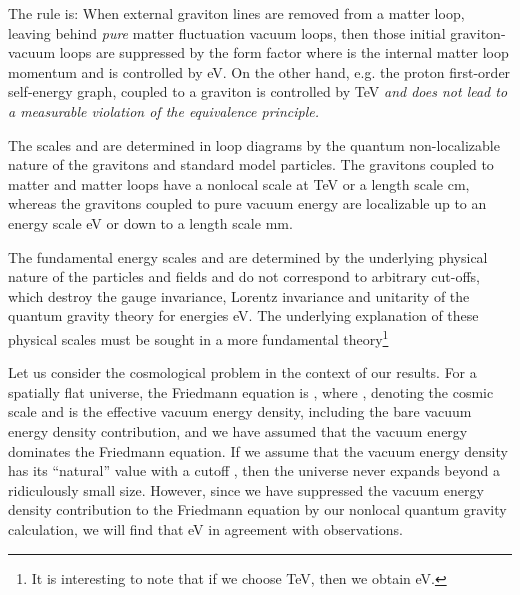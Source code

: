\documentclass[a4paper,11pt]{article}
\begin{document}
The rule is: When external graviton lines are removed from a
matter loop, leaving behind {\it pure} matter fluctuation vacuum loops,
then those initial graviton-vacuum loops are suppressed by the form factor
\coordHE{} where \coordHE{} is the internal matter loop momentum and
\coordHE{} is controlled by \coordHE{} eV.
On the other hand, e.g. the proton first-order self-energy graph, coupled
to a graviton is controlled by \coordHE{} TeV {\it
and does not lead to a measurable violation of the equivalence principle.}

The scales \coordHE{} and \coordHE{} are determined in
loop diagrams by the quantum non-localizable nature of the gravitons and
standard model particles. The gravitons coupled to matter and matter
loops have a nonlocal scale at \coordHE{} TeV or a
length scale \coordHE{} cm, whereas the gravitons coupled to
pure vacuum energy are localizable up to an energy scale
\coordHE{} eV or down to a length scale \coordHE{}
mm.

The fundamental energy scales \coordHE{} and
\coordHE{} are determined by the underlying physical nature
of the particles and fields and do not correspond to arbitrary cut-offs,
which destroy the gauge invariance, Lorentz invariance and unitarity of the
quantum gravity theory for energies \coordHE{} eV.
The underlying explanation of these physical scales must be sought in a
more fundamental theory\footnote{It is interesting to note that if we
choose \coordHE{} TeV, then we obtain
\coordHE{}
eV.}

Let us consider the cosmological problem in the context of our
results. For a spatially flat universe, the Friedmann equation
is
\coordHE{},
where \coordHE{}, \coordHE{} denoting the cosmic
scale and \coordHE{} is the effective vacuum energy density,
including the bare vacuum energy density contribution, and we
have assumed that the vacuum energy dominates the Friedmann
equation. If we assume that the vacuum energy density has its
``natural'' value with a cutoff \coordHE{}, then the
universe never expands beyond a ridiculously small size.
However, since we have suppressed the vacuum energy density
contribution to the Friedmann equation by our nonlocal quantum
gravity calculation, we will find that
\coordHE{} eV in agreement with observations.
\end{document}
